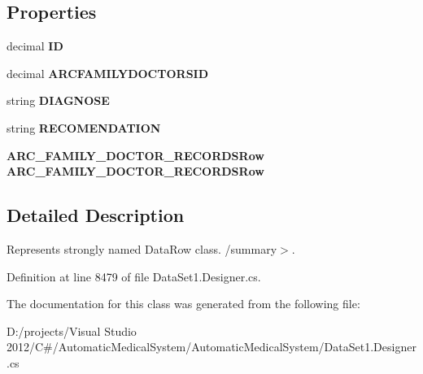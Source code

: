 \subsection*{Properties}
\begin{CompactItemize}
\item 
decimal \textbf{ID}\hspace{0.3cm}{\tt  [get, set]}\label{class_automatic_medical_system_1_1_data_set1_1_1_d_i_a_g_n_o_s_e___f_m___d_o_c_t_o_r_row_00dd5e4c985dc5d13a118f2b1c3a426e}

\item 
decimal \textbf{ARCFAMILYDOCTORSID}\hspace{0.3cm}{\tt  [get, set]}\label{class_automatic_medical_system_1_1_data_set1_1_1_d_i_a_g_n_o_s_e___f_m___d_o_c_t_o_r_row_7d39ddd01b2f21678ac12e682c16e6bf}

\item 
string \textbf{DIAGNOSE}\hspace{0.3cm}{\tt  [get, set]}\label{class_automatic_medical_system_1_1_data_set1_1_1_d_i_a_g_n_o_s_e___f_m___d_o_c_t_o_r_row_bae4a290e77a96fcbf976ad76d600451}

\item 
string \textbf{RECOMENDATION}\hspace{0.3cm}{\tt  [get, set]}\label{class_automatic_medical_system_1_1_data_set1_1_1_d_i_a_g_n_o_s_e___f_m___d_o_c_t_o_r_row_ac70a5e5bb6683de524a70130c3dbc0a}

\item 
{\bf ARC\_\-FAMILY\_\-DOCTOR\_\-RECORDSRow} \textbf{ARC\_\-FAMILY\_\-DOCTOR\_\-RECORDSRow}\hspace{0.3cm}{\tt  [get, set]}\label{class_automatic_medical_system_1_1_data_set1_1_1_d_i_a_g_n_o_s_e___f_m___d_o_c_t_o_r_row_a1c116783243e5255448b3f19a80e8e8}

\end{CompactItemize}


\subsection{Detailed Description}
Represents strongly named DataRow class. /summary$>$. 

Definition at line 8479 of file DataSet1.Designer.cs.

The documentation for this class was generated from the following file:\begin{CompactItemize}
\item 
D:/projects/Visual Studio 2012/C\#/AutomaticMedicalSystem/AutomaticMedicalSystem/DataSet1.Designer.cs\end{CompactItemize}
